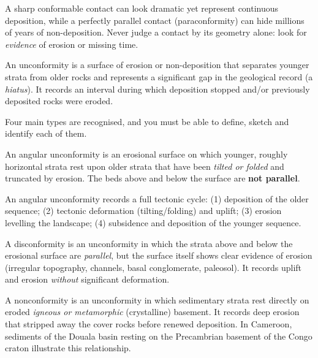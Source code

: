 \documentclass[11pt]{article}
\newcommand{\cle}[1]{{\popxbold\color{popdark}#1}}
\newcounter{popsec}
\newcounter{popsub}
\newcommand{\courssub}[1]{%
  \stepcounter{popsub}%
  \par\vspace{9pt}\noindent{\popxbold\fontsize{11.5}{13}\selectfont\color{popink}{\color{poporange}\thepopsec.\thepopsub}\hspace{6pt}#1}\par\nopagebreak\vspace{4pt}
}
\begin{document}
\begin{attention}
A sharp conformable contact can look dramatic yet represent continuous deposition, while a perfectly parallel contact (paraconformity) can hide millions of years of non-deposition. Never judge a contact by its geometry alone: look for \emph{evidence} of erosion or missing time.
\end{attention}

\courssub{Unconformities: Definition and Types}

\begin{definition}[Unconformity]
An \cle{unconformity} is a surface of erosion or non-deposition that separates younger strata from older rocks and represents a significant \cle{gap in the geological record} (a \emph{hiatus}). It records an interval during which deposition stopped and/or previously deposited rocks were eroded.
\end{definition}

Four main types are recognised, and you must be able to define, sketch and identify each of them.

\begin{definition}
An \cle{angular unconformity} is an erosional surface on which younger, roughly horizontal strata rest upon older strata that have been \emph{tilted or folded} and truncated by erosion. The beds above and below the surface are \textbf{not parallel}.
\end{definition}

An angular unconformity records a full tectonic cycle: (1) deposition of the older sequence; (2) tectonic deformation (tilting/folding) and uplift; (3) erosion levelling the landscape; (4) subsidence and deposition of the younger sequence.

\begin{definition}[Disconformity]
A \cle{disconformity} is an unconformity in which the strata above and below the erosional surface are \emph{parallel}, but the surface itself shows clear evidence of erosion (irregular topography, channels, basal conglomerate, paleosol). It records uplift and erosion \emph{without} significant deformation.
\end{definition}

\begin{definition}[Nonconformity]
A \cle{nonconformity} is an unconformity in which sedimentary strata rest directly on eroded \emph{igneous or metamorphic} (crystalline) basement. It records deep erosion that stripped away the cover rocks before renewed deposition. In Cameroon, sediments of the Douala basin resting on the Precambrian basement of the Congo craton illustrate this relationship.
\end{definition}
\end{document}
